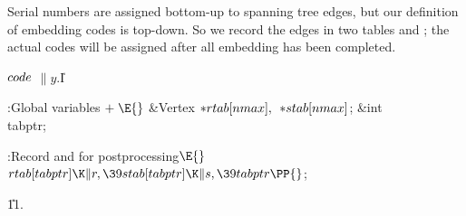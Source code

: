 Serial numbers are assigned bottom-up to spanning tree edges,
but our definition of embedding codes is top-down. So we record the
edges in two tables  and ; the actual codes will be
assigned
after all embedding has been completed.

\Y\B\4\D$\\{code}$ \5
$\|y.{}$\|I\par
\Y\B\4:Global variables\X${}\mathrel+\E{}$\6
\&{Vertex} ${}{*}\\{rtab}[\\{nmax}],{}$ ${}{*}\\{stab}[\\{nmax}]{}$;\6
\&{int} \\{tabptr};\par
\fi

\B{}:Record  and  for postprocessing\X${}%
\E{}$\6
$\\{rtab}[\\{tabptr}]\K\|r,\39\\{stab}[\\{tabptr}]\K\|s,\39\\{tabptr}\PP{}$;\par
\U11.\fi

